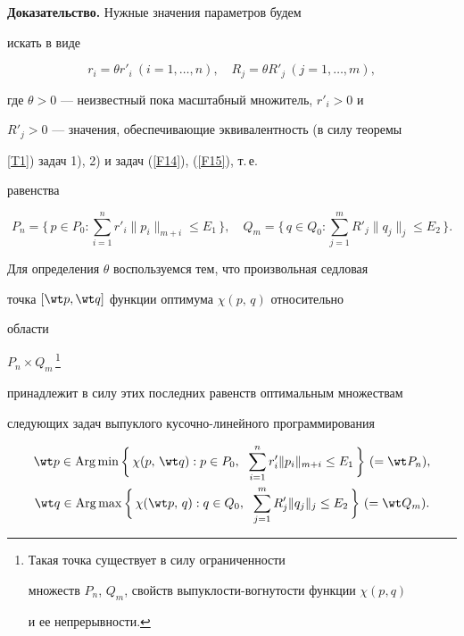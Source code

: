 {\bf Доказательство.} Нужные значения параметров будем


искать в виде


\begin{equation}


\label{F19}


r_i=\theta r'_i\ (i=1,\dotsc,n),\quad R_j=\theta R'_j


\ (j=1,\dotsc,m),


\end{equation}


где $\theta>0$ --- неизвестный пока масштабный множитель, $r'_i>0$ и


$R'_j>0$ --- значения, обеспечивающие эквивалентность (в силу теоремы


\ref{T1}) задач 1), 2) и задач (\ref{F14}), (\ref{F15}), т.\,е.{}


равенства


$$


P_n=\bigg\{\,p\in P_0: \sum^n_{i=1} r'_i\| p_i\|_{m+i}\le


E_1\,\bigg\},\quad Q_m=\bigg\{\,q\in Q_0: \sum\limits^m_{j=1} R'_j\|


q_j\|_j\le E_2\,\bigg\}.


$$


Для определения $\theta$ воспользуемся тем, что произвольная седловая


точка $[\wt p, \wt q]$ функции оптимума $\chi(p,\,q)$ относительно


области


$P_n\times Q_m$\,\footnote{Такая точка существует в силу ограниченности


множеств $P_n$, $Q_m$, свойств выпуклости-вогнутости функции $\chi(p,q)$


и ее непрерывности.}


принадлежит в силу этих последних равенств оптимальным множествам


следующих задач выпуклого кусочно-линейного программирования


\begin{gather*}


\wt p \in \Arg\min\bigg\{\, \chi(p,\,\wt q): p\in P_0,\ \;


\sum^n_{i=1} r'_i\| p_i\|_{m+i}\le E_1\,\bigg\}\ (=\wt P_n), \\


%


\wt q\in \Arg\max\bigg\{\, \chi(\wt p,\,q): q\in Q_0,\ \;


\sum^m_{j=1} R'_j\| q_j\|_j\le E_2\, \bigg\}\ (=\wt Q_m).


\end{gather*}


